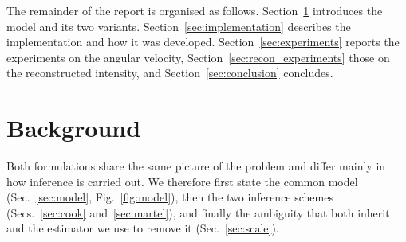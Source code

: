 \documentclass[journal]{IEEEtran}
\begin{document}
The remainder of the report is organised as follows. Section~\ref{sec:background}
introduces the model and its two variants. Section~\ref{sec:implementation}
describes the implementation and how it was developed.
Section~\ref{sec:experiments} reports the experiments on the angular
velocity, Section~\ref{sec:recon_experiments} those on the reconstructed
intensity, and Section~\ref{sec:conclusion} concludes.


\section{Background}
\label{sec:background}

Both formulations share the same picture of the problem and differ mainly in how
inference is carried out. We therefore first state the common model
(Sec.~\ref{sec:model}, Fig.~\ref{fig:model}), then the two inference schemes
(Secs.~\ref{sec:cook} and~\ref{sec:martel}), and finally the ambiguity that both
inherit and the estimator we use to remove it (Sec.~\ref{sec:scale}).
\end{document}
